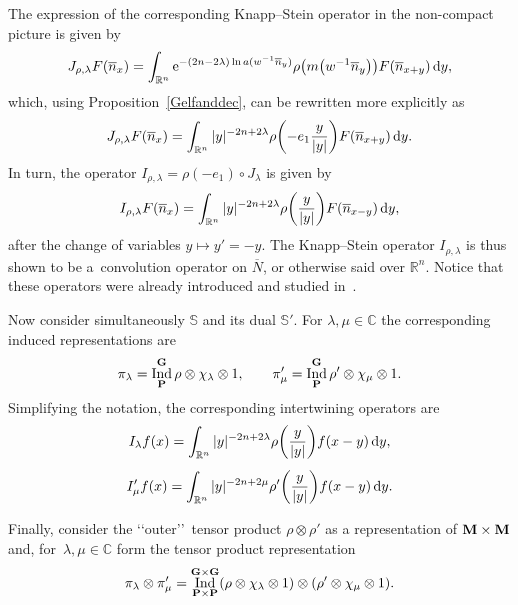 \documentclass[10pt,a4paper]{amsart}
\DeclareMathOperator{\Ind}{Ind}
\numberwithin{equation}{section}
\begin{document}
The expression of the corresponding Knapp--Stein operator in the non-compact picture is given by
\begin{gather*}
J_{ \rho,\lambda} F(\overline n_x) = \int_{\mathbb R^n} {\rm e}^{-( 2n-2\lambda)\ln a(w^{-1} \overline n_y)} \rho\big(m\big(w^{-1} \overline n_y\big)
\big) F(\overline n_{x+y})\,{\rm d}y ,
\end{gather*}
which, using Proposition~\ref{Gelfanddec}, can be rewritten more explicitly as
\begin{gather*}
J_{ \rho,\lambda} F(\overline n_x) = \int_{\mathbb R^n} \vert y\vert^{-2n+2\lambda} \rho\bigg({-}e_1\frac{y}{\vert y\vert}\bigg)F(\overline n_{x+y})\,{\rm d}y .
\end{gather*}
In turn, the operator $I_{\rho, \lambda} = \rho(-e_1)\circ J_\lambda$ is given by
\begin{gather*}\label{KS}
 I_{\rho,\lambda} F( \overline n_x) = \int_{\mathbb R^n} \vert y\vert^{-2n+2\lambda} \rho\bigg(\frac{y}{\vert y \vert}\bigg) F(\overline n_{x-y})\,{\rm d}y ,
\end{gather*}
after the change of variables $y\mapsto y'=-y$. The Knapp--Stein operator $I_{ \rho,\lambda}$ is thus shown to be a~convolution operator on $\overline N$, or otherwise said over $\mathbb R^n$. Notice that these operators were already introduced and studied in~\cite{co}.

Now consider simultaneously $\mathbb S$ and its dual $\mathbb S'$. For $\lambda, \mu \in \mathbb C$ the corresponding induced representations are
\begin{gather*}
\pi_\lambda = \Ind_{\bf P}^{\bf G} \rho\otimes\chi_\lambda\otimes 1, \qquad
\pi'_\mu = \Ind_{\bf P}^{\bf G} \rho'\otimes \chi_\mu\otimes 1 .
\end{gather*}
Simplifying the notation, the corresponding intertwining operators	are
\begin{gather}
I_\lambda f(x) = \int_{\mathbb R^n}\vert y\vert^{-2n+2\lambda}\rho\bigg( \frac{y}{\vert y\vert}\bigg) f(x-y)\,{\rm d}y , \nonumber
\\[1ex]
I_\mu' f(x) = \int_{\mathbb R^n} \vert y\vert^{-2n+2\mu}\rho' \bigg( \frac{y}{\vert y\vert}\bigg)f(x-y)\,{\rm d}y .\label{defKS}
\end{gather}

Finally, consider the \lq\lq outer\rq\rq\ tensor product $\rho\otimes \rho'$ as a representation of $\bf M\times \bf M$ and, for~$\lambda, \mu\in \mathbb C$ form the tensor product representation
\begin{gather*}
\pi_\lambda \otimes \pi'_\mu= \Ind_{\bf P\times \bf P}^{\bf G\times \bf G}(\rho\otimes\chi_\lambda\otimes 1)\otimes (\rho'\otimes \chi_\mu\otimes 1) .
\end{gather*}
\end{document}
